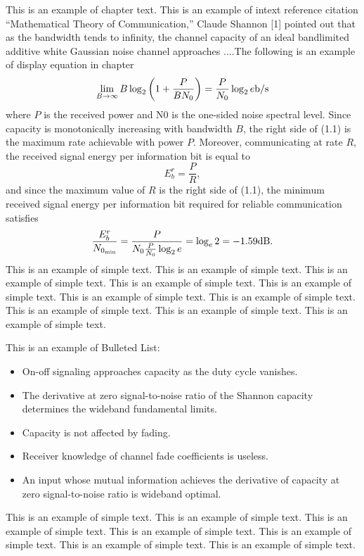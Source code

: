 \documentclass[11pt]{now}
\begin{document}
This is an example of chapter text. This is an example of intext reference citation ``Mathematical Theory of Communication,'' Claude Shannon [1] pointed out that as the bandwidth tends to infinity, the
channel capacity of an ideal bandlimited additive white Gaussian
noise channel approaches ....The following is an example of display equation in chapter
\begin{equation}
\lim_{B\rightarrow \infty} B \log_2 \left(1 + \frac{P}{BN_0}\right) =
\frac{P}{N_0}\log_2 e {\rm b/s}
\end{equation}
where $P$ is the received power and N0 is the one-sided noise spectral
level. Since capacity is monotonically increasing with bandwidth $B$,
the right side of (1.1) is the maximum rate achievable with power $P$.
Moreover, communicating at rate $R$, the received signal energy per
information bit is equal to
\begin{equation}
E^r_b =\frac{P}{R},
\end{equation}
and since the maximum value of $R$ is the right side of (1.1), the minimum
received signal energy per information bit required for reliable
communication satisfies
\begin{equation}
\frac{E^r_b}{N_{0_{\rm min}}} = \frac{P}{N_0\frac{P}{N_0}\log_2
                           e}=\log_e2= -1.59{\rm dB.}
\end{equation}
This is an example of simple text. This is an example of simple text.
This is an example of simple text. This is an example of simple text.
This is an example of simple text. This is an example of simple text.
This is an example of simple text. This is an example of simple text.
This is an example of simple text. This is an example of simple text.

This is an example of Bulleted List:
\begin{itemize}
\item{}
On-off signaling approaches capacity as the duty cycle vanishes.
\item{}
The derivative at zero signal-to-noise ratio of the Shannon
capacity determines the wideband fundamental limits.
\item{}
Capacity is not affected by fading.
\item{}
Receiver knowledge of channel fade coefficients is useless.
\item{}
An input whose mutual information achieves the derivative
of capacity at zero signal-to-noise ratio is wideband optimal.
\end{itemize}
This is an example of simple text. This is an example of simple text.
This is an example of simple text. This is an example of simple text.
This is an example of simple text. This is an example of simple text.
This is an example of simple text.
\end{document}

